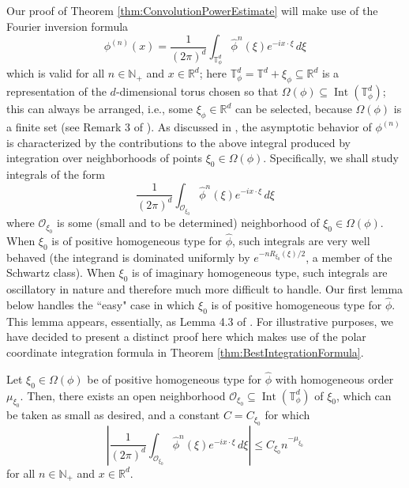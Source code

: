 \documentclass[smallextended]{svjour3}
\theoremstyle{remark}
\newcommand\Interior{\operatorname{Int}}
\begin{document}
\noindent Our proof of Theorem \ref{thm:ConvolutionPowerEstimate} will make use of the Fourier inversion formula
\begin{equation}\label{eq:FourierInversionConvolutionPower}
\phi^{(n)}(x)=\frac{1}{(2\pi)^d}\int_{\mathbb{T}_\phi^d}\widehat{\phi}^n(\xi)e^{-ix\cdot\xi}\,d\xi
\end{equation}
which is valid for all $n\in\mathbb{N}_+$ and $x\in\mathbb{R}^d$; here $\mathbb{T}_\phi^d=\mathbb{T}^d+\xi_\phi\subseteq\mathbb{R}^d$
is a representation of the $d$-dimensional torus chosen so that $\Omega(\phi)\subseteq \Interior(\mathbb{T}_{\phi}^d)$; this can always be arranged, i.e., some $\xi_\phi\in\mathbb{R}^d$ can be selected, because $\Omega(\phi)$ is a finite set (see Remark 3 of \cite{randles_convolution_2017}). As discussed in \cite{randles_convolution_2017}, the asymptotic behavior of $\phi^{(n)}$ is characterized by the contributions to the above integral produced by integration over neighborhoods of points $\xi_0\in\Omega(\phi).$ Specifically, we shall study integrals of the form
\begin{equation}\label{eq:LocalizedFourierInversionConvolutionPower}
\frac{1}{(2\pi)^d}\int_{\mathcal{O}_{\xi_0}}\widehat{\phi}^n(\xi)e^{-ix\cdot\xi}\,d\xi
\end{equation}
where $\mathcal{O}_{\xi_0}$ is some (small and to be determined) neighborhood of $\xi_0\in\Omega(\phi)$. When $\xi_0$ is of positive homogeneous type for $\widehat{\phi}$, such integrals are very well behaved (the integrand is dominated uniformly by $e^{-nR_{\xi_0}(\xi)/2}$, a member of the Schwartz class). When $\xi_0$ is of imaginary homogeneous type, such integrals are oscillatory in nature and therefore much more difficult to handle. Our first lemma below handles the ``easy" case in which $\xi_0$ is of positive homogeneous type for $\widehat{\phi}$. This lemma appears, essentially, as Lemma 4.3 of \cite{randles_convolution_2017}. For illustrative purposes, we have decided to present a distinct proof here which makes use of the polar coordinate integration formula in Theorem \ref{thm:BestIntegrationFormula}. 
\begin{lemma}\label{lem:EstPosHom}
Let $\xi_0\in\Omega(\phi)$ be of positive homogeneous type for $\widehat{\phi}$ with homogeneous order $\mu_{\xi_0}$. Then, there exists an open neighborhood $\mathcal{O}_{\xi_0}\subseteq\Interior(\mathbb{T}^d_\phi)$ of $\xi_0$, which can be taken as small as desired, and a constant $C=C_{\xi_0}$ for which
\begin{equation*}
    \left|\frac{1}{(2\pi)^d}\int_{\mathcal{O}_{\xi_0}}\widehat{\phi}^n(\xi)e^{-ix\cdot\xi}\,d\xi\right|\leq 
    C_{\xi_0} n^{-\mu_{\xi_0}}
\end{equation*}
for all $n\in\mathbb{N}_+$ and $x\in\mathbb{R}^d$.
\end{lemma}
\end{document}
